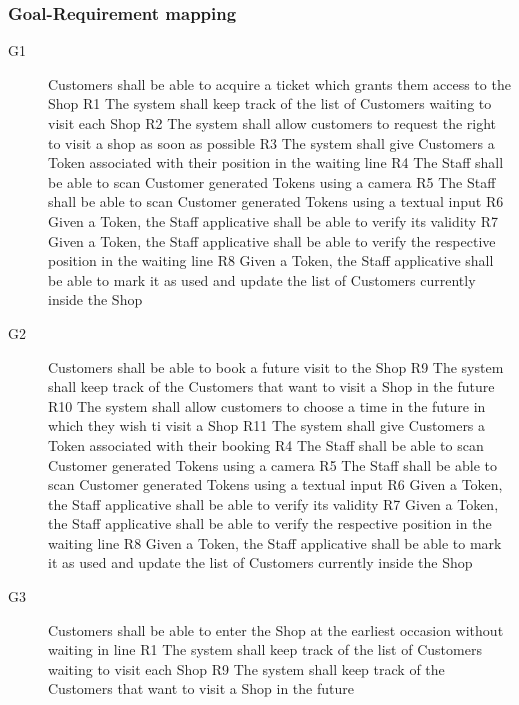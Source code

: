 \subsubsection{Goal-Requirement mapping}
\begin{description}
    \item [G1] Customers shall be able to acquire a ticket which grants them access to the Shop
          \subitem R1 The system shall keep track of the list of Customers waiting to visit each Shop
          \subitem R2 The system shall allow customers to request the right to visit a shop as soon as possible
          \subitem R3 The system shall give Customers a Token associated with their position in the waiting line
          \subitem R4 The Staff shall be able to scan Customer generated Tokens using a camera
          \subitem R5 The Staff shall be able to scan Customer generated Tokens using a textual input
          \subitem R6 Given a Token, the Staff applicative shall be able to verify its validity
          \subitem R7 Given a Token, the Staff applicative shall be able to verify the respective position in the waiting line
          \subitem R8 Given a Token, the Staff applicative shall be able to mark it as used and update the list of Customers currently inside the Shop
    \item [G2]  Customers shall be able to book a future visit to the Shop
          \subitem R9 The system shall keep track of the Customers that want to visit a Shop in the future
          \subitem R10 The system shall allow customers to choose a time in the future in which they wish ti visit a Shop
          \subitem R11 The system shall give Customers a Token associated with their booking
          \subitem R4 The Staff shall be able to scan Customer generated Tokens using a camera
          \subitem R5 The Staff shall be able to scan Customer generated Tokens using a textual input
          \subitem R6 Given a Token, the Staff applicative shall be able to verify its validity
          \subitem R7 Given a Token, the Staff applicative shall be able to verify the respective position in the waiting line
          \subitem R8 Given a Token, the Staff applicative shall be able to mark it as used and update the list of Customers currently inside the Shop
    \item [G3]  Customers shall be able to enter the Shop at the earliest occasion without waiting in line
          \subitem R1 The system shall keep track of the list of Customers waiting to visit each Shop
          \subitem R9 The system shall keep track of the Customers that want to visit a Shop in the future

\end{description}
